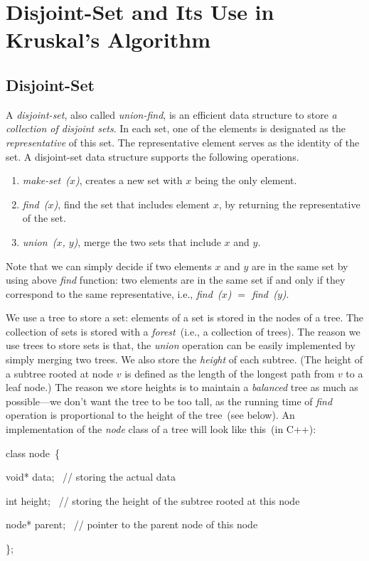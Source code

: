 \documentclass[letterpaper,11pt]{article}
\theoremstyle{mytheorem}
\newcommand{\aaa}[1]{\hspace{0.65cm}\parbox[t]{15.3cm}{#1}}
\newcommand{\aab}[1]{\hspace{1.15cm}\parbox[t]{15.0cm}{#1}}
\newcommand{\xxx}{\par\vspace{0.1cm}}
\begin{document}
\section*{Disjoint-Set and Its Use in Kruskal's Algorithm}

\subsection*{Disjoint-Set}

A \emph{disjoint-set}, also called \emph{union-find},
is an efficient data structure to store \emph{a collection of disjoint sets}.
In each set, one of the elements is designated as the \emph{representative}
of this set. The representative element serves
as the identity of the set. 
A disjoint-set data structure supports the following operations.
\vspace*{-\topsep}
\begin{enumerate}
\item \emph{make-set~($x$)}, creates a new set with $x$ being the only element.
\item \emph{find~($x$)}, find the set that includes element $x$, by returning the representative of the set.
\item \emph{union~($x$, $y$)}, merge the two sets that include $x$ and $y$.
\end{enumerate}

Note that we can simply decide if two elements $x$ and $y$ are in the same set
by using above \emph{find} function: two elements are in the same set
if and only if they correspond to the same representative, i.e., \emph{find~($x$) $=$ find~($y$)}.

We use a tree to store a set: elements of a set is stored in the nodes of a tree.
The collection of sets is stored with a \emph{forest}~(i.e., a collection of trees).
The reason we use trees to store sets is that, the \emph{union} operation
can be easily implemented by simply merging two trees.
We also store the \emph{height} of each subtree.
(The height of a subtree rooted at node $v$ is defined as the length of the longest path 
from $v$ to a leaf node.) The reason we store heights is to maintain a \emph{balanced} tree
as much as possible---we don't want the tree to be too tall, as the running time
of \emph{find} operation is proportional to the height of the tree~(see below).
An implementation of the \emph{node} class of a tree will look like this~(in C++):

\begin{minipage}{0.8\textwidth}
	\aaa {class node~\{}\xxx
	\aab {void* data; \ // storing the actual data}\xxx
	\aab {int height; \ // storing the height of the subtree rooted at this node}\xxx
	\aab {node* parent; \ // pointer to the parent node of this node}\xxx
	\aaa {\};}\xxx
\end{minipage}
\end{document}
